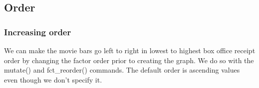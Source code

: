 \documentclass[
]{krantz}
\makeatletter
\newenvironment{Shaded}{\begin{snugshade}}{\end{snugshade}}
\newcommand{\DataTypeTok}[1]{\textcolor[rgb]{0.27,0.27,0.27}{#1}}
\newcommand{\KeywordTok}[1]{\textcolor[rgb]{0.27,0.27,0.27}{\textbf{#1}}}
\newcommand{\NormalTok}[1]{#1}
\newcommand{\OperatorTok}[1]{\textcolor[rgb]{0.43,0.43,0.43}{\textbf{#1}}}
\newcommand{\StringTok}[1]{\textcolor[rgb]{0.5,0.5,0.5}{#1}}
\newenvironment{kframe}{%
\medskip{}
\setlength{\fboxsep}{.8em}
 \def\at@end@of@kframe{}%
 \ifinner\ifhmode%
  \def\at@end@of@kframe{\end{minipage}}%
  \begin{minipage}{\columnwidth}%
 \fi\fi%
 \def\FrameCommand##1{\hskip\@totalleftmargin \hskip-\fboxsep
 \colorbox{shadecolor}{##1}\hskip-\fboxsep
     \hskip-\linewidth \hskip-\@totalleftmargin \hskip\columnwidth}%
 \MakeFramed {\advance\hsize-\width
   \@totalleftmargin\z@ \linewidth\hsize
   \@setminipage}}%
 {\par\unskip\endMakeFramed%
 \at@end@of@kframe}
\renewenvironment{Shaded}{\begin{kframe}}{\end{kframe}}
\makeatother
\begin{document}
\hypertarget{order}{%
\subsection{Order}\label{order}}

\hypertarget{increasing-order}{%
\subsubsection{Increasing order}\label{increasing-order}}

We can make the movie bars go left to right in lowest to highest box office receipt order by changing the factor order prior to creating the graph. We do so with the mutate() and fct\_reorder() commands. The default order is ascending values even though we don't specify it.

\begin{Shaded}
\end{Shaded}
\end{document}
